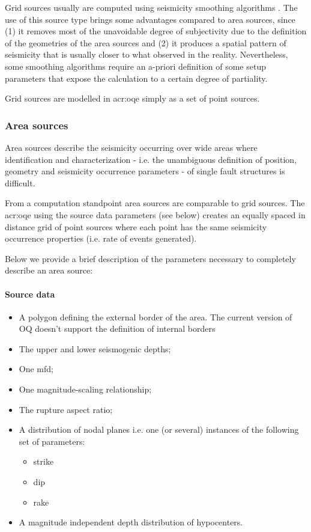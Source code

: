 Grid sources usually are computed using seismicity smoothing algorithms 
\citep[][amongst many others]{frankel1995,woo1996}. 
%
The use of this source type brings some advantages compared to area sources, 
since (1) it removes most of the unavoidable degree of subjectivity due to 
the definition of the geometries of the area sources and (2) it produces
a spatial pattern of seismicity that is usually closer to what observed in 
the reality. 
Nevertheless, some smoothing algorithms require an a-priori definition of 
some setup parameters that expose the calculation to a certain degree of 
partiality.

Grid sources are modelled in \gls{acr:oqe} simply as a set of point sources. 
\subsubsection{Area sources}
\label{hazarcorollarydefinitiond:seismic_source_types:areaSources}
%
Area sources describe the seismicity occurring over wide areas where  
identification and characterization - i.e. the unambiguous definition 
of position, geometry and seismicity occurrence parameters - of single 
fault structures is difficult. 

From a computation standpoint area sources are comparable to grid sources.
The \gls{acr:oqe} using the source data parameters (see below)  
creates an equally spaced in distance grid of point sources where
each point has the same seismicity occurrence properties (i.e. rate
of events generated).

Below we provide a brief description of the parameters necessary to 
completely describe an area source:
%
\paragraph{Source data}
\begin{itemize}
\item A polygon defining the external border of the area. 
The current version of OQ doesn't support the definition 
of internal borders
\item The upper and lower seismogenic depths;
\item One \gls{mfd};
\item One magnitude-scaling relationship;
\item The rupture aspect ratio;
\item A distribution of nodal planes i.e. one (or several) instances 
    of the following set of parameters:
\begin{itemize}
	\item strike
	\item dip
	\item rake
\end{itemize}
\item A magnitude independent depth distribution of hypocenters. 
\end{itemize}

